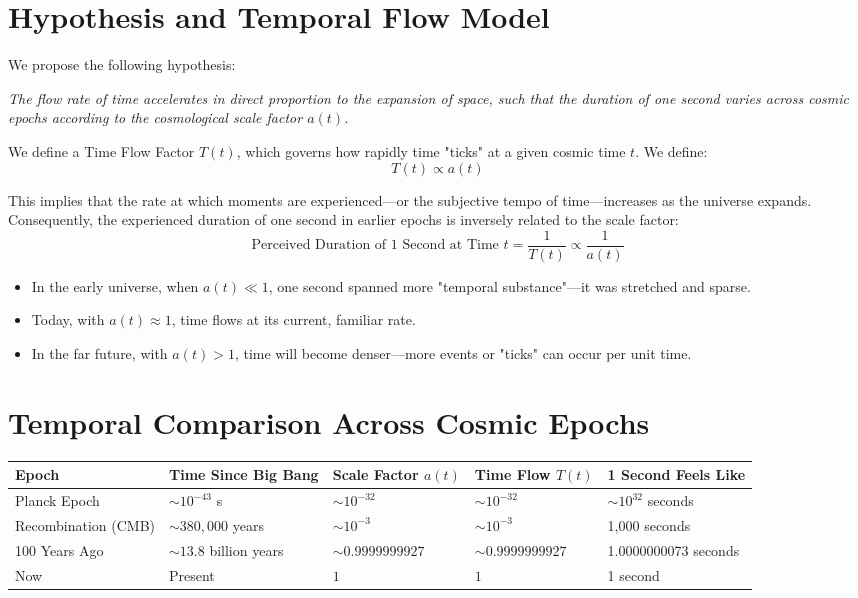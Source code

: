 \documentclass[12pt]{article}
\begin{document}
\section{Hypothesis and Temporal Flow Model}
We propose the following hypothesis:

\textit{The flow rate of time accelerates in direct proportion to the expansion of space, such that the duration of one second varies across cosmic epochs according to the cosmological scale factor $a(t)$.}

We define a Time Flow Factor $T(t)$, which governs how rapidly time "ticks" at a given cosmic time $t$. We define:
\[
T(t) \propto a(t)
\]

This implies that the rate at which moments are experienced—or the subjective tempo of time—increases as the universe expands. Consequently, the experienced duration of one second in earlier epochs is inversely related to the scale factor:
\[
\text{Perceived Duration of 1 Second at Time } t = \frac{1}{T(t)} \propto \frac{1}{a(t)}
\]

\begin{itemize}
    \item In the early universe, when $a(t) \ll 1$, one second spanned more "temporal substance"—it was stretched and sparse.
    \item Today, with $a(t) \approx 1$, time flows at its current, familiar rate.
    \item In the far future, with $a(t) > 1$, time will become denser—more events or "ticks" can occur per unit time.
\end{itemize}

\section{Temporal Comparison Across Cosmic Epochs}

\begin{center}
\begin{tabular}{|p{3.2cm}|p{3.2cm}|p{2.5cm}|p{2.5cm}|p{3.2cm}|}
\hline
\textbf{Epoch} & \textbf{Time Since Big Bang} & \textbf{Scale Factor $a(t)$} & \textbf{Time Flow $T(t)$} & \textbf{1 Second Feels Like} \\
\hline
Planck Epoch & $\sim 10^{-43}$ s & $\sim 10^{-32}$ & $\sim 10^{-32}$ & $\sim 10^{32}$ seconds \\
Recombination (CMB) & $\sim 380,000$ years & $\sim 10^{-3}$ & $\sim 10^{-3}$ & 1,000 seconds \\
100 Years Ago & $\sim 13.8$ billion years & $\sim 0.9999999927$ & $\sim 0.9999999927$ & 1.0000000073 seconds \\
Now & Present & $1$ & $1$ & 1 second \\
\hline
\end{tabular}
\end{center}
\end{document}
